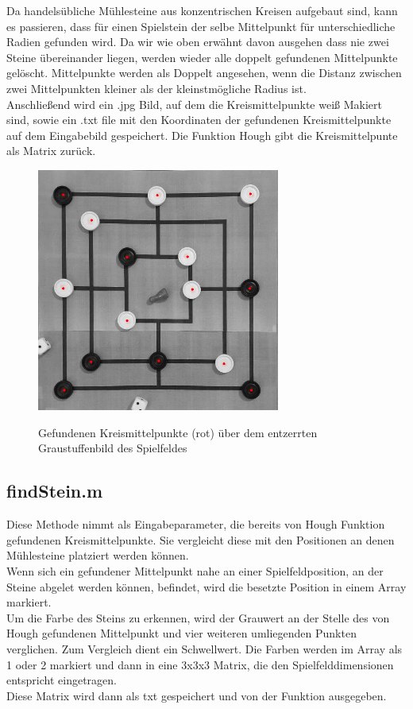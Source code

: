 \documentclass[paper=A4, deutsch]{scrartcl}
\begin{document}
Da handelsübliche Mühlesteine aus konzentrischen Kreisen aufgebaut sind, kann es passieren, dass für einen Spielstein der selbe Mittelpunkt für unterschiedliche Radien gefunden wird.  Da wir wie oben erwähnt davon ausgehen dass nie zwei Steine übereinander liegen, werden wieder alle doppelt gefundenen Mittelpunkte gelöscht. Mittelpunkte werden als Doppelt angesehen, wenn die Distanz zwischen zwei Mittelpunkten kleiner als der kleinstmögliche Radius ist. \\

Anschließend wird ein .jpg Bild, auf dem die Kreismittelpunkte weiß Makiert sind, sowie ein .txt file mit den Koordinaten der gefundenen Kreismittelpunkte auf dem Eingabebild gespeichert. Die Funktion Hough gibt die Kreismittelpunte als Matrix zurück. \\ 

\begin{figure}[ht]
	\centering
		\includegraphics[width=8cm]{hough_performance.jpg}\\
	\caption[Gefundenen Kreismittelpunkte (rot) über dem entzerrten Graustuffenbild des Spielfeldes]{Gefundenen Kreismittelpunkte (rot) über dem entzerrten Graustuffenbild des Spielfeldes}
	\label{fig:hougresult}
\end{figure}


\subsection{findStein.m}
Diese Methode nimmt als Eingabeparameter, die bereits von Hough Funktion gefundenen Kreismittelpunkte. Sie vergleicht diese mit den Positionen an denen Mühlesteine platziert werden können.\\
Wenn sich ein gefundener Mittelpunkt nahe an einer Spielfeldposition, an der Steine abgelet werden können,  befindet,  wird die besetzte Position in einem Array markiert. \\
Um die Farbe des Steins zu erkennen, wird der Grauwert an der Stelle des von Hough gefundenen Mittelpunkt und vier weiteren umliegenden Punkten verglichen. Zum Vergleich dient ein Schwellwert. Die Farben werden  im Array als 1 oder 2 markiert und dann in eine 3x3x3 Matrix, die den Spielfelddimensionen entspricht eingetragen.\\
Diese Matrix wird dann als txt gespeichert und von der Funktion ausgegeben.
\end{document}

